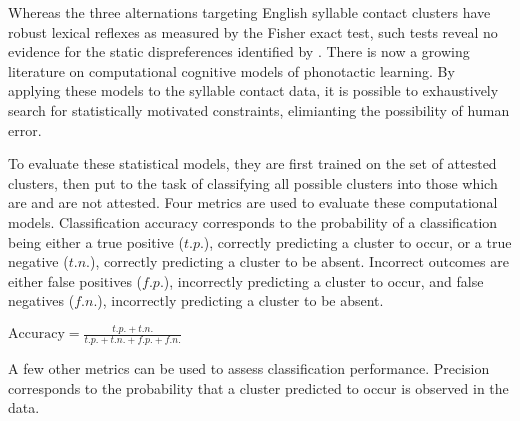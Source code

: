 
Whereas the three alternations targeting English syllable contact clusters have robust lexical reflexes as measured by the Fisher exact test, such tests reveal no evidence for the static dispreferences identified by \citeauthor{Pierrehumbert1994}. There is now a growing literature on computational cognitive models of phonotactic learning. By applying these models to the syllable contact data, it is possible to exhaustively search for statistically motivated constraints, elimianting the possibility of human error. 

To evaluate these statistical models, they are first trained on the set of attested clusters, then put to the task of classifying all possible clusters into those which are and are not attested. Four metrics are used to evaluate these computational models. Classification accuracy corresponds to the probability of a classification being either a true positive ($t.p.$), correctly predicting a cluster to occur, or a true negative ($t.n.$), correctly predicting a cluster to be absent. Incorrect outcomes are either false positives ($f.p.$), incorrectly predicting a cluster to occur, and false negatives ($f.n.$), incorrectly predicting a cluster to be absent. 


\ex $\displaystyle \textrm{Accuracy} = \frac{t.p. + t.n.}{t.p. + t.n. + f.p. + f.n.}$ \xe

\noindent
A few other metrics can be used to assess classification performance. Precision corresponds to the probability that a cluster predicted to occur is observed in the data. 

